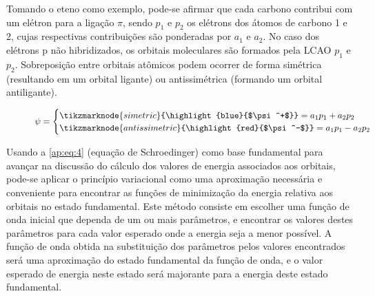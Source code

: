 Tomando o eteno como exemplo, pode-se afirmar que cada carbono contribui com um elétron para a ligação $\pi$, sendo $p_1$ e $p_2$ os elétrons dos átomos de carbono 1 e 2, cujas respectivas contribuições são ponderadas por $a_1$ e $a_2$. No caso dos elétrons p não hibridizados, os orbitais moleculares são formados pela \gls{LCAO} $p_1$ e $p_2$. Sobreposição entre orbitais atômicos podem ocorrer de forma simétrica (resultando em um orbital ligante) ou antissimétrica (formando um orbital antiligante).

\begin{figure}[htb]
    \vspace{2\baselineskip}
\begin{equation}
    \label{ap:eq:3}
    \psi =
    \begin{cases}
\tikzmarknode{simetric}{\highlight{blue}{$\psi^+$}} = a_1 p_1 + a_2 p_2 \\
\tikzmarknode{antissimetric}{\highlight{red}{$\psi^-$}} = a_1 p_1 - a_2 p_2
    \end{cases}
\end{equation}
\end{figure}

Usando a \autoref{ap:eq:4} (equação de Schroedinger) como base fundamental para avançar na discussão do cálculo dos valores de energia associados aos orbitais, pode-se aplicar o princípio variacional como uma aproximação necessária e conveniente para encontrar as funções de minimização da energia relativa aos orbitais no estado fundamental. Este método consiste em escolher uma função de onda inicial que dependa de um ou mais parâmetros, e encontrar os valores destes parâmetros para cada valor esperado onde a energia seja a menor possível. A função de onda obtida na substituição dos parâmetros pelos valores encontrados será uma aproximação do estado fundamental da função de onda, e o valor esperado de energia neste estado será majorante para a energia deste estado fundamental.


